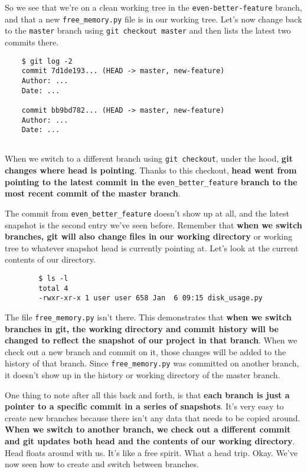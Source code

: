 	So we see that we're on a clean working tree in the \verb|even-better-feature| branch, and that a new \verb|free_memory.py| file is in our working tree. 
	Let's now change back to the \texttt{master} branch using \texttt{git checkout master} and then lists the latest two commits there. 
	
\begin{verbatim}
	$ git log -2
	commit 7d1de193... (HEAD -> master, new-feature)
	Author: ...
	Date: ...
	
	commit bb9bd782... (HEAD -> master, new-feature)
	Author: ...
	Date: ...
		
\end{verbatim}	
	
	When we switch to a different branch using \texttt{git checkout}, under the hood, \textbf{git changes where head is pointing}. Thanks to this checkout,\textbf{ head went from pointing to the latest commit in the} \verb|even_better_feature| \textbf{branch to the most recent commit of the master branch}. 
	
	The commit from \verb|even_better_feature| doesn't show up at all, and the latest snapshot is the second entry we've seen before. Remember that\textbf{ when we switch branches, git will also change files in our working directory} or working tree to whatever snapshot head is currently pointing at. Let's look at the current contents of our directory.
	
	\begin{verbatim}
		$ ls -l
		total 4
		-rwxr-xr-x 1 user user 658 Jan  6 09:15 disk_usage.py		
	\end{verbatim}
	
	The file \verb|free_memory.py| isn't there. This demonstrates that\textbf{ when we switch branches in git, the working directory and commit history will be changed to reflect the snapshot of our project in that branch}. When we check out a new branch and commit on it, those changes will be added to the history of that branch. Since \verb|free_memory.py| was committed on another branch, it doesn't show up in the history or working directory of the master branch. 
	
	One thing to note after all this back and forth, is that \textbf{each branch is just a pointer to a specific commit in a series of snapshots}. It's very easy to create new branches because there isn't any data that needs to be copied around.\textbf{ When we switch to another branch, we check out a different commit and git updates both head and the contents of our working directory}. Head floats around with us. It's like a free spirit. What a head trip. Okay. We've now seen how to create and switch between branches. 
	
